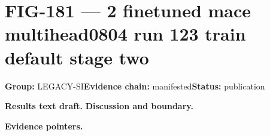 \clearpage
\section{FIG-181 --- 2 finetuned mace multihead0804 run 123 train default stage two}
\label{figpage:fig-181}
\textbf{Group:} LEGACY-SI\quad \textbf{Evidence chain:} manifested\quad \textbf{Status:} publication

\textbf{Results text draft.} 
\textbf{Discussion and boundary.} 


\textbf{Evidence pointers.}



\vfill
